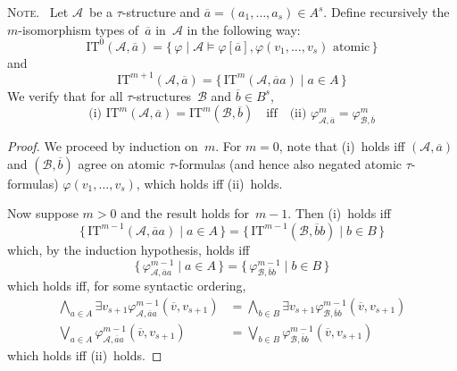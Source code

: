 \documentclass[letterpaper]{article}
\newcommand{\A}{\mathcal{A}}
\newcommand{\B}{\mathcal{B}}
\newcommand{\itypes}{\mathrm{IT}}
\newcommand{\obar}[1]{\overline{#1}}
\newcommand{\biglor}{\bigvee}
\newcommand{\bigland}{\bigwedge}
\newcommand{\note}{\noindent\textsc{Note.}\ }
\theoremstyle{plain}
\begin{document}
\note
Let $\A$~be a $\tau$-structure and $\obar{a}=(a_1,\ldots,a_s)\in A^s$. Define recursively the $m$-isomorphism types of~$\obar{a}$ in~$\A$ in the following way:
$$\itypes^0(\A,\obar{a})=\{\,\varphi\mid\A\models\varphi[\obar{a}], \text{$\varphi(v_1,\ldots,v_s) $~atomic}\,\}$$
and
$$\itypes^{m+1}(\A,\obar{a})=\{\,\itypes^m(\A,\obar{a}a)\mid a\in A\,\}$$
We verify that for all $\tau$-structures~$\B$ and $\obar{b}\in B^s$,
$$\text{(i) }\itypes^m(\A,\obar{a})=\itypes^m(\B,\obar{b})\quad\text{iff}\quad\text{(ii) }\varphi_{\A,\obar{a}}^m=\varphi_{\B,\obar{b}}^m$$
\begin{proof}
We proceed by induction on~$m$. For $m=0$, note that (i)~holds iff $(\A,\obar{a})$ and $(\B,\obar{b})$ agree on atomic $\tau$-formulas (and hence also negated atomic $\tau$-formulas) $\varphi(v_1,\ldots,v_s)$, which holds iff (ii)~holds.

Now suppose $m>0$ and the result holds for~$m-1$. Then (i)~holds iff
$$\{\,\itypes^{m-1}(\A,\obar{a}a)\mid a\in A\,\}=\{\,\itypes^{m-1}(\B,\obar{b}b)\mid b\in B\,\}$$
which, by the induction hypothesis, holds iff
$$\{\,\varphi_{\A,\obar{a}a}^{m-1}\mid a\in A\,\}=\{\,\varphi_{\B,\obar{b}b}^{m-1}\mid b\in B\,\}$$
which holds iff, for some syntactic ordering,
\begin{align*}
\bigland_{a\in A}\exists v_{s+1}\varphi_{\A,\obar{a}a}^{m-1}(\obar{v},v_{s+1})&=\bigland_{b\in B}\exists v_{s+1}\varphi_{\B,\obar{b}b}^{m-1}(\obar{v},v_{s+1})\\
\biglor_{a\in A}\varphi_{\A,\obar{a}a}^{m-1}(\obar{v},v_{s+1})&=\biglor_{b\in B}\varphi_{\B,\obar{b}b}^{m-1}(\obar{v},v_{s+1})
\end{align*}
which holds iff (ii)~holds.
\end{proof}
\end{document}
